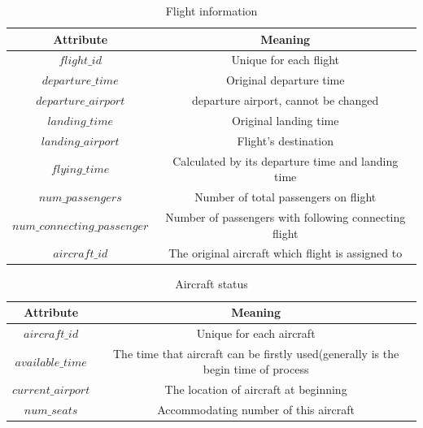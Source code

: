 \documentclass[senior]{IPSstyle}
\begin{document}
\begin{table}[t]
\renewcommand{\arraystretch}{1}
\label{Flight_information_dataset}
\begin{center}
\begin{tabular}{|c|c|}
\hline
\multicolumn{1}{|c|}{Attribute}
&\multicolumn{1}{c|}{Meaning}
\\
\hline
\(flight\_id\)	&	Unique for each flight
\\	\hline
\(departure\_time\)	&	Original departure time
\\	\hline
\(departure\_airport\) &   departure airport, cannot be changed
\\  \hline
\(landing\_time\) &   Original landing time
\\  \hline
\(landing\_airport\) &   Flight's destination
\\  \hline
\(flying\_time\) &   Calculated by its departure time and landing time
\\  \hline
\(num\_passengers\)	&   Number of total passengers on flight
\\  \hline
\(num\_connecting\_passenger\) &   Number of passengers with following connecting flight
\\  \hline
\(aircraft\_id\) &   The original aircraft which flight is  assigned to
\\  \hline
\end{tabular}
\caption{Flight information}
\end{center}
\end{table}

\begin{table}
\renewcommand{\arraystretch}{1.2}
\begin{center}
\begin{tabular}{|c|c|}
\hline
\multicolumn{1}{|c|}{Attribute}
&\multicolumn{1}{c|}{Meaning}
\\  \hline
\(aircraft\_id\)	&	Unique for each aircraft
\\	\hline
\(available\_time\)	&	The time that aircraft can be firstly used(generally is the begin time of process
\\	\hline
\(current\_airport\) &  The location of aircraft at beginning
\\  \hline
\(num\_seats\) &  Accommodating number of this aircraft
\\  \hline
\end{tabular}
\caption{Aircraft status}
\label{Aircraft_status_dataset}
\end{center}
\end{table}
\end{document}
